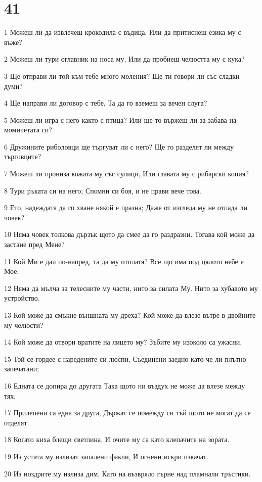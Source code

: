 \chapter{41}

\par 1 Можеш ли да извлечеш крокодила с въдица, Или да притиснеш езика му с въже?
\par 2 Можеш ли тури оглавник на носа му, Или да пробиеш челюстта му с кука?
\par 3 Ще отправи ли той към тебе много моления? Ще ти говори ли със сладки думи?
\par 4 Ще направи ли договор с тебе, Та да го вземеш за вечен слуга?
\par 5 Можеш ли игра с него както с птица? Или ще то вържеш ли за забава на момичетата си?
\par 6 Дружините риболовци ще търгуват ли с него? Ще го разделят ли между търговците?
\par 7 Можеш ли прониза кожата му със сулици, Или главата му с рибарски копия?
\par 8 Тури ръката си на него; Спомни си боя, и не прави вече това.
\par 9 Ето, надеждата да го хване някой е празна; Даже от изгледа му не отпада ли човек?
\par 10 Няма човек толкова дързък щото да смее да го раздразни. Тогава кой може да застане пред Мене?
\par 11 Кой Ми е дал по-напред, та да му отплатя? Все що има под цялото небе е Мое.
\par 12 Няма да мълча за телесните му части, нито за силата Му. Нито за хубавото му устройство.
\par 13 Кой може да смъкне външната му дреха? Кой може да влезе вътре в двойните му челюсти?
\par 14 Кой може да отвори вратите на лицето му? Зъбите му изоколо са ужасни.
\par 15 Той се гордее с наредените си люспи, Съединени заедно като че ли плътно запечатани;
\par 16 Едната се допира до другата Така щото ни въздух не може да влезе между тях;
\par 17 Прилепени са една за друга, Държат се помежду си тъй щото не могат да се отделят.
\par 18 Когато киха блещи светлина, И очите му са като клепачите на зората.
\par 19 Из устата му излизат запалени факли, И огнени искри изкачат.
\par 20 Из ноздрите му излиза дим, Като на възвряло гърне над пламнали тръстики.
